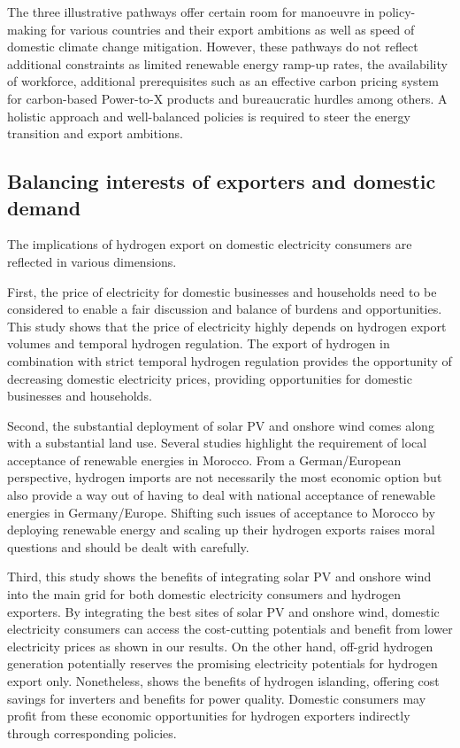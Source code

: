 The three illustrative pathways offer certain room for manoeuvre in policy-making for various countries and their export ambitions as well as speed of domestic climate change mitigation. However, these pathways do not reflect additional constraints as limited renewable energy ramp-up rates, the availability of workforce, additional prerequisites such as an effective carbon pricing system for carbon-based Power-to-X products and bureaucratic hurdles among others. A holistic approach and well-balanced policies is required to steer the energy transition and export ambitions.


\subsection*{Balancing interests of exporters and domestic demand}
\label{subsec:balancedinterests}
The implications of hydrogen export on domestic electricity consumers are reflected in various dimensions. 

First, the price of electricity for domestic businesses and households need to be considered to enable a fair discussion and balance of burdens and opportunities. This study shows that the price of electricity highly depends on hydrogen export volumes and temporal hydrogen regulation. The export of hydrogen in combination with strict temporal hydrogen regulation provides the opportunity of decreasing domestic electricity prices, providing opportunities for domestic businesses and households.

Second, the substantial deployment of solar PV and onshore wind comes along with a substantial land use. Several studies \cite{Terrapon-Pfaff2019, Hanger2016} highlight the requirement of local acceptance of renewable energies in Morocco. From a German/European perspective, hydrogen imports are not necessarily the most economic option \cite{Merten2023} but also provide a way out of having to deal with national acceptance of renewable energies in Germany/Europe.
Shifting such issues of acceptance to Morocco by deploying renewable energy and scaling up their hydrogen exports raises moral questions and should be dealt with carefully. %

Third, this study shows the benefits of integrating solar PV and onshore wind into the main grid for both domestic electricity consumers and hydrogen exporters. By integrating the best sites of solar PV and onshore wind, domestic electricity consumers can access the cost-cutting potentials and benefit from lower electricity prices as shown in our results. On the other hand, off-grid hydrogen generation potentially reserves the promising electricity potentials for hydrogen export only. Nonetheless, \cite{Tries2023b} shows the benefits of hydrogen islanding, offering cost savings for inverters and benefits for power quality. Domestic consumers may profit from these economic opportunities for hydrogen exporters indirectly through corresponding policies.

